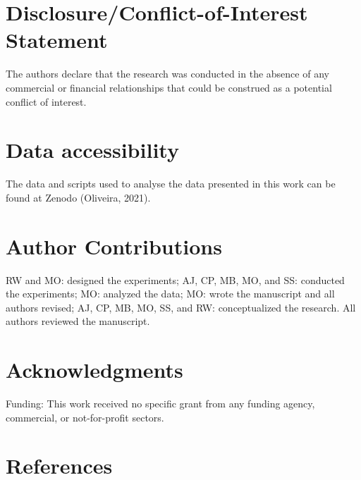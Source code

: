 \documentclass[utf8]{frontiersSCNS}
\begin{document}
\hypertarget{disclosureconflict-of-interest-statement}{%
\section*{Disclosure/Conflict-of-Interest
Statement}\label{disclosureconflict-of-interest-statement}}

The authors declare that the research was conducted in the absence of
any commercial or financial relationships that could be construed as a
potential conflict of interest.

\hypertarget{data-accessibility}{%
\section*{Data accessibility}\label{data-accessibility}}

The data and scripts used to analyse the data presented in this work can
be found at Zenodo (Oliveira, 2021).

\hypertarget{author-contributions}{%
\section*{Author Contributions}\label{author-contributions}}

RW and MO: designed the experiments; AJ, CP, MB, MO, and SS: conducted
the experiments; MO: analyzed the data; MO: wrote the manuscript and all
authors revised; AJ, CP, MB, MO, SS, and RW: conceptualized the
research. All authors reviewed the manuscript.

\hypertarget{acknowledgments}{%
\section*{Acknowledgments}\label{acknowledgments}}

Funding: This work received no specific grant from any funding agency,
commercial, or not-for-profit sectors.

\hypertarget{references}{%
\section*{References}\label{references}}
\end{document}

